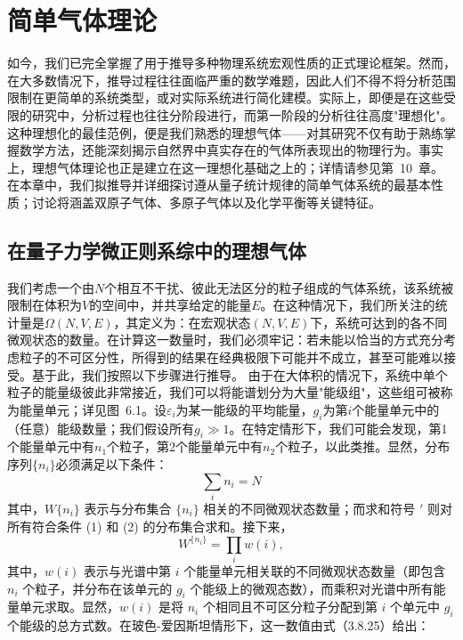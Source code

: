 ﻿\chapter{简单气体理论}
如今，我们已完全掌握了用于推导多种物理系统宏观性质的正式理论框架。然而，在大多数情况下，推导过程往往面临严重的数学难题，因此人们不得不将分析范围限制在更简单的系统类型，或对实际系统进行简化建模。实际上，即便是在这些受限的研究中，分析过程也往往分阶段进行，而第一阶段的分析往往高度"理想化"。这种理想化的最佳范例，便是我们熟悉的理想气体——对其研究不仅有助于熟练掌握数学方法，还能深刻揭示自然界中真实存在的气体所表现出的物理行为。事实上，理想气体理论也正是建立在这一理想化基础之上的；详情请参见第~10~章。
在本章中，我们拟推导并详细探讨遵从量子统计规律的简单气体系统的最基本性质；讨论将涵盖双原子气体、多原子气体以及化学平衡等关键特征。
\section{在量子力学微正则系综中的理想气体}\label{ux5728ux91cfux5b50ux529bux5b66ux5faeux6b63ux5219ux7cfbux7efcux4e2dux7684ux7406ux60f3ux6c14ux4f53}
我们考虑一个由\(N\)个相互不干扰、彼此无法区分的粒子组成的气体系统，该系统被限制在体积为\(V\)的空间中，并共享给定的能量\(E\)。在这种情况下，我们所关注的统计量是\(\Omega(N,V,E)\)，其定义为：在宏观状态\((N,V,E)\)下，系统可达到的各不同微观状态的数量。在计算这一数量时，我们必须牢记：若未能以恰当的方式充分考虑粒子的不可区分性，所得到的结果在经典极限下可能并不成立，甚至可能难以接受。基于此，我们按照以下步骤进行推导。
由于在大体积的情况下，系统中单个粒子的能量级彼此非常接近，我们可以将能谱划分为大量"能级组"，这些组可被称为能量单元；详见图~6.1。设\(\varepsilon_i\)为某一能级的平均能量，\(g_i\)为第\(i\)个能量单元中的（任意）能级数量；我们假设所有\(g_i \gg 1\)。在特定情形下，我们可能会发现，第1个能量单元中有\(n_1\)个粒子，第2个能量单元中有\(n_2\)个粒子，以此类推。显然，分布序列\(\{n_i\}\)必须满足以下条件：
\begin{equation}\tag{6.1.1}\label{eq:6.1.1}
\sum _ { i } n _ { i } = N
\end{equation}
其中，\(W\{n_i\}\) 表示与分布集合 \(\{n_i\}\) 相关的不同微观状态数量；而求和符号 \(\prime\) 则对所有符合条件 (1) 和 (2) 的分布集合求和。接下来，
\begin{equation}\tag{6.1.2}\label{eq:6.1.2}
W ^{\{ n _ { i} \} } = \prod _ { i } w ( i ) ,
\end{equation}
其中，\(w(i)\) 表示与光谱中第 \(i\) 个能量单元相关联的不同微观状态数量（即包含 \(n_i\) 个粒子，并分布在该单元的 \(g_i\) 个能级上的微观态数），而乘积对光谱中所有能量单元求取。显然，\(w(i)\) 是将 \(n_i\) 个相同且不可区分粒子分配到第 \(i\) 个单元中 \(g_i\) 个能级的总方式数。在玻色-爱因斯坦情形下，这一数值由式（3.8.25）给出：
